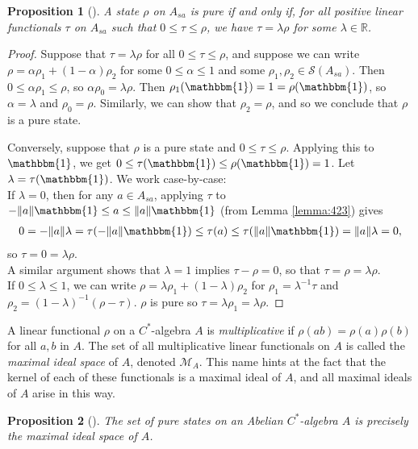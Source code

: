 \documentclass[12pt,a4paper]{report}
\theoremstyle{plain}
\newtheorem{prop}{Proposition}
\theoremstyle{definition}
\newcommand{\1}{\mathbbm{1}}
\newcommand{\R}{\mathbb{R}}
\newcommand{\M}{\mathcal{M}}
\renewcommand{\S}{\mathscr{S}}
\begin{document}
\begin{prop}[{\cite[3.4.6]{kadison83}}]\label{prop:pure2}
	A state $\rho$ on $A_{sa}$ is pure if and only if, for all positive linear functionals $\tau$ on
	 $A_{sa}$ such that $0\leq\tau\leq\rho$, we have $\tau =\lambda\rho$ for some $\lambda\in\R$. 
\end{prop}
\begin{proof}
	Suppose that $\tau =\lambda\rho$ for all $0\leq\tau\leq\rho$, and suppose we can write 
	$\rho=\alpha\rho_1+(1-\alpha)\rho_2$ for some $0\leq\alpha\leq1$ and some $\rho_1,\rho_2 \in
	\S(A_{sa})$. Then $0\leq\alpha\rho_1\leq\rho$, so $\alpha\rho_0 = \lambda\rho$. Then 
	$\rho_1(\1)=1=\rho(\1)$, so $\alpha = \lambda$ and $\rho_0 =\rho$. Similarly, we can show that 
	$\rho_2=\rho$, and so we conclude that $\rho$ is a pure state.
	
	Conversely, suppose that $\rho$ is a pure state and $0\leq\tau\leq\rho$. Applying this to $\1$,
	we get $0\leq\tau(\1)\leq\rho(\1) = 1$. Let $\lambda = \tau(\1)$. We work case-by-case: \\
	If $\lambda=0$, then for any $a\in A_{sa}$, applying $\tau$ to $-\|a\|\1\leq a\leq\|a\|\1$ 
	(from Lemma \ref{lemma:423}) gives
	\begin{align*}
		0=-\|a\|\lambda=\tau(-\|a\|\1)\leq\tau(a)\leq\tau(\|a\|\1)=\|a\|\lambda=0,
	\end{align*}
	so $\tau=0=\lambda\rho$. \\
	A similar argument shows that $\lambda=1$ implies $\tau-\rho=0$, so that $\tau=\rho=\lambda\rho$.\\
	If $0\leq\lambda\leq 1$, we can write $\rho=\lambda\rho_1+(1-\lambda)\rho_2$ for 
	$\rho_1=\lambda^{-1}\tau$ and $\rho_2=(1-\lambda)^{-1}(\rho-\tau)$. $\rho$ is pure so 
	$\tau=\lambda\rho_1=\lambda\rho$.
	
\end{proof}
A linear functional $\rho$ on a $C^\ast$-algebra $A$ is \emph{multiplicative} if $\rho(ab)=\rho(a)
\rho(b)$ for all $a,b$ in $A$. The set of all multiplicative linear functionals on $A$ is called the 
\emph{maximal ideal space} of $A$, denoted $\M_A$. This name hints at the fact that the kernel of each 
of these functionals is a maximal ideal of $A$, and all maximal ideals of $A$ arise in this way. 
\cite[Theorem I.2.5]{davidson96}
\begin{prop}[{\cite[4.4.1]{kadison83}}]\label{prop:puremult}
	The set of pure states on an Abelian $C^\ast$-algebra $A$ is precisely the maximal ideal space of 
	$A$.
\end{prop}
\end{document}
